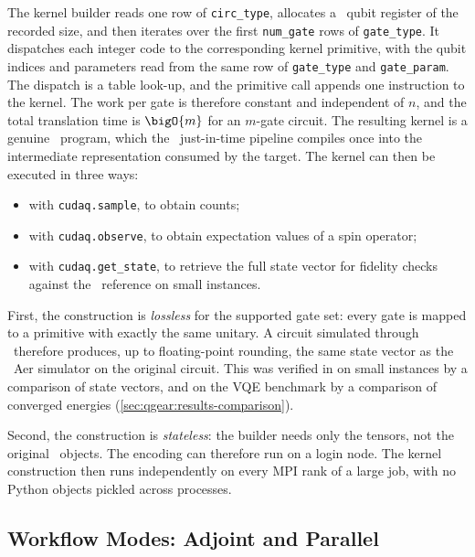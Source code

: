 The kernel builder reads one row of \texttt{circ\_type}, allocates a \cudaq\ qubit register of the recorded size, and then iterates over the first \texttt{num\_gate} rows of \texttt{gate\_type}. It dispatches each integer code to the corresponding kernel primitive, with the qubit indices and parameters read from the same row of \texttt{gate\_type} and \texttt{gate\_param}. The dispatch is a table look-up, and the primitive call appends one instruction to the kernel. The work per gate is therefore constant and independent of $n$, and the total translation time is $\bigO{m}$ for an $m$-gate circuit. The resulting kernel is a genuine \cudaq\ program, which the \cudaq\ just-in-time pipeline compiles once into the intermediate representation consumed by the target. The kernel can then be executed in three ways:
\begin{itemize}
  \item with \texttt{cudaq.sample}, to obtain counts;
  \item with \texttt{cudaq.observe}, to obtain expectation values of a spin operator;
  \item with \texttt{cudaq.get\_state}, to retrieve the full state vector for fidelity checks against the \qiskit\ reference on small instances.
\end{itemize}

First, the construction is \emph{lossless} for the supported gate set: every gate is mapped to a primitive with exactly the same unitary. A circuit simulated through \qgear\ therefore produces, up to floating-point rounding, the same state vector as the \qiskit\ Aer simulator on the original circuit. This was verified in \cite{guo2025qgear} on small instances by a comparison of state vectors, and on the VQE benchmark by a comparison of converged energies (\cref{sec:qgear:results-comparison}).

Second, the construction is \emph{stateless}: the builder needs only the tensors, not the original \qiskit\ objects. The encoding can therefore run on a login node. The kernel construction then runs independently on every MPI rank of a large job, with no Python objects pickled across processes.

\subsection{Workflow Modes: Adjoint and Parallel}\label{sec:qgear:modes}

